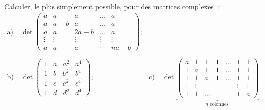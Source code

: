 \documentclass[12pt,french,oneside,a4paper]{memoir} %
\begin{document}
\begin{exo}
Calculer, le plus simplement possible, pour des matrices complexes~:
\begin{equation*}
\begin{array}{ll}
\mbox{a)} \quad \det \left( \begin{array}{ccccc}
a &a &a &\ldots &a \\
a &a-b &a &\ldots &a \\
a &a &2a-b &\ldots &a \\
\vdots & \vdots & \vdots & \vdots & \vdots \\
a &a &a &\cdots &na-b
\end{array} \right); & \\
\\
\mbox{b)} \quad \det \left( \begin{array}{cccc}
1 &a &a^2 &a^4 \\
1 &b &b^2 &b^4 \\
1 &c &c^2 &c^4 \\
1 &d &d^2 &d^4
\end{array} \right) ;
& \mbox{c)} \quad \det 
\underbrace{
\left( \begin{array}{ccccccc}
a &1 &1 &1 &\ldots &1 &1 \\
1 &a &1 &1 &\ldots &1 &1 \\
1 &1 &a &1 &\ldots &1 &1 \\
\vdots & \vdots & & & & \vdots & \vdots \\
1 &1 &\ldots & & &1 &a
\end{array} \right)}_{\mbox{$n$ colonnes }}.
\end{array}
\end{equation*}
\end{exo}
\end{document}
